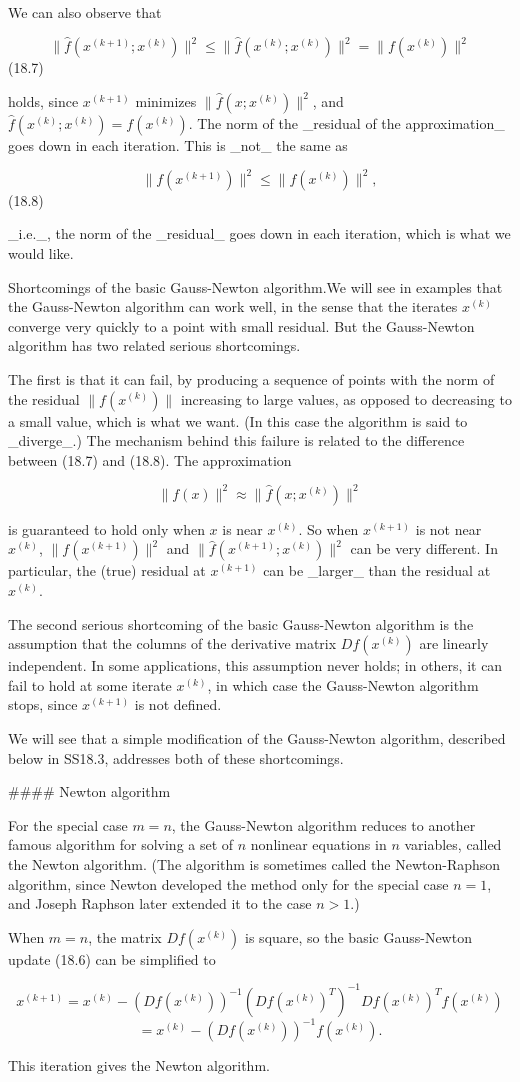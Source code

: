 We can also observe that

\[\|\hat{f}(x^{(k+1)};x^{(k)})\|^{2}\leq\|\hat{f}(x^{(k)};x^{(k)})\|^{2}=\|f(x^{(k) })\|^{2}\] (18.7)

holds, since \(x^{(k+1)}\) minimizes \(\|\hat{f}(x;x^{(k)})\|^{2}\), and \(\hat{f}(x^{(k)};x^{(k)})=f(x^{(k)})\). The norm of the _residual of the approximation_ goes down in each iteration. This is _not_ the same as

\[\|f(x^{(k+1)})\|^{2}\leq\|f(x^{(k)})\|^{2},\] (18.8)

_i.e._, the norm of the _residual_ goes down in each iteration, which is what we would like.

Shortcomings of the basic Gauss-Newton algorithm.We will see in examples that the Gauss-Newton algorithm can work well, in the sense that the iterates \(x^{(k)}\) converge very quickly to a point with small residual. But the Gauss-Newton algorithm has two related serious shortcomings.

The first is that it can fail, by producing a sequence of points with the norm of the residual \(\|f(x^{(k)})\|\) increasing to large values, as opposed to decreasing to a small value, which is what we want. (In this case the algorithm is said to _diverge_.) The mechanism behind this failure is related to the difference between (18.7) and (18.8). The approximation

\[\|f(x)\|^{2}\approx\|\hat{f}(x;x^{(k)})\|^{2}\]

is guaranteed to hold only when \(x\) is near \(x^{(k)}\). So when \(x^{(k+1)}\) is not near \(x^{(k)}\), \(\|f(x^{(k+1)})\|^{2}\) and \(\|\hat{f}(x^{(k+1)};x^{(k)})\|^{2}\) can be very different. In particular, the (true) residual at \(x^{(k+1)}\) can be _larger_ than the residual at \(x^{(k)}\).

The second serious shortcoming of the basic Gauss-Newton algorithm is the assumption that the columns of the derivative matrix \(Df(x^{(k)})\) are linearly independent. In some applications, this assumption never holds; in others, it can fail to hold at some iterate \(x^{(k)}\), in which case the Gauss-Newton algorithm stops, since \(x^{(k+1)}\) is not defined.

We will see that a simple modification of the Gauss-Newton algorithm, described below in SS18.3, addresses both of these shortcomings.

#### Newton algorithm

For the special case \(m=n\), the Gauss-Newton algorithm reduces to another famous algorithm for solving a set of \(n\) nonlinear equations in \(n\) variables, called the Newton algorithm. (The algorithm is sometimes called the Newton-Raphson algorithm, since Newton developed the method only for the special case \(n=1\), and Joseph Raphson later extended it to the case \(n>1\).)

When \(m=n\), the matrix \(Df(x^{(k)})\) is square, so the basic Gauss-Newton update (18.6) can be simplified to

\[x^{(k+1)} = x^{(k)}-(Df(x^{(k)}))^{-1}(Df(x^{(k)})^{T})^{-1}Df(x^{(k)})^{T} f(x^{(k)})\] \[= x^{(k)}-(Df(x^{(k)}))^{-1}f(x^{(k)}).\]

This iteration gives the Newton algorithm.

 